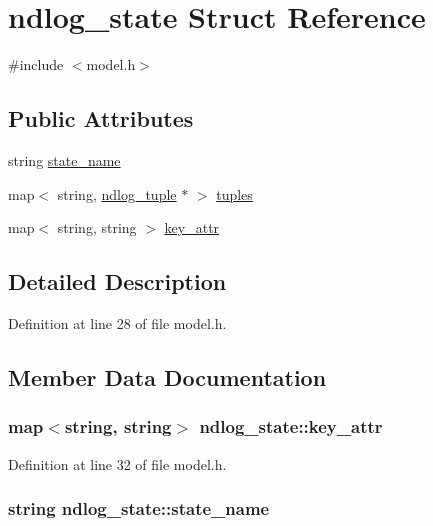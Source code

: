 \hypertarget{structndlog__state}{\section{ndlog\-\_\-state Struct Reference}
\label{structndlog__state}
}


{\ttfamily \#include $<$model.\-h$>$}

\subsection*{Public Attributes}
\begin{DoxyCompactItemize}
\item 
string \hyperlink{structndlog__state_a9762ce5cb5a617075c9715c99511e19f}{state\-\_\-name}
\item 
map$<$ string, \hyperlink{structndlog__tuple}{ndlog\-\_\-tuple} $\ast$ $>$ \hyperlink{structndlog__state_a30e8b1c430795b117da273e238766e54}{tuples}
\item 
map$<$ string, string $>$ \hyperlink{structndlog__state_a2e31cf7fa49b3dcd0d02daa382148831}{key\-\_\-attr}
\end{DoxyCompactItemize}


\subsection{Detailed Description}


Definition at line 28 of file model.\-h.



\subsection{Member Data Documentation}
\hypertarget{structndlog__state_a2e31cf7fa49b3dcd0d02daa382148831}{
\subsubsection[{key\-\_\-attr}]{\setlength{\rightskip}{0pt plus 5cm}map$<$string, string$>$ ndlog\-\_\-state\-::key\-\_\-attr}}\label{structndlog__state_a2e31cf7fa49b3dcd0d02daa382148831}


Definition at line 32 of file model.\-h.

\hypertarget{structndlog__state_a9762ce5cb5a617075c9715c99511e19f}{
\subsubsection[{state\-\_\-name}]{\setlength{\rightskip}{0pt plus 5cm}string ndlog\-\_\-state\-::state\-\_\-name}}\label{structndlog__state_a9762ce5cb5a617075c9715c99511e19f}


